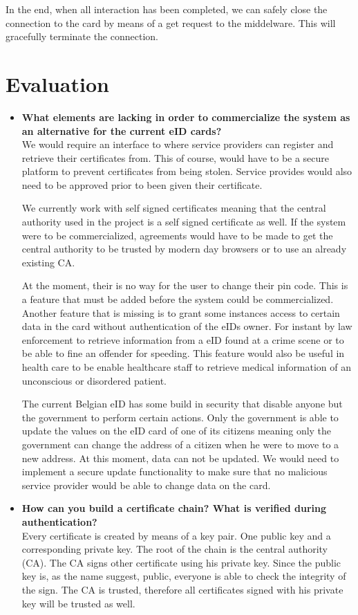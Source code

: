\documentclass[12pt]{report}
\begin{document}
In the end, when all interaction has been completed, we can safely close the connection to the card by means of a get request to the middelware. This will gracefully terminate the connection.

\section{Evaluation}
\begin{itemize}
\item \textbf{What elements are lacking in order to commercialize the system as an alternative for the current eID cards?}\\ 
We would require an interface to where service providers can register and retrieve their certificates from. This of course, would have to be a secure platform to prevent certificates from being stolen. Service provides would also need to be approved prior to been given their certificate.

We currently work with self signed certificates meaning that the central authority used in the project is a self signed certificate as well. If the system were to be commercialized, agreements would have to be made to get the central authority to be trusted by modern day browsers or to use an already existing CA.

At the moment, their is no way for the user to change their pin code. This is a feature that must be added before the system could be commercialized. Another feature that is missing is to grant some instances access to certain data in the card without authentication of the eIDs owner. For instant by law enforcement to retrieve information from a eID found at a crime scene or to be able to fine an offender for speeding. This feature would also be useful in health care to be enable healthcare staff to retrieve medical information of an unconscious or disordered patient.

The current Belgian eID has some build in security that disable anyone but the government to perform certain actions. Only the government is able to update the values on the eID card of one of its citizens meaning only the government can change the address of a citizen when he were to move to a new address. At this moment, data can not be updated. We would need to implement a secure update functionality to make sure that no malicious service provider would be able to change data on the card.

\item \textbf{How can you build a certificate chain? What is verified during authentication?}\\
Every certificate is created by means of a key pair. One public key and a corresponding private key. The root of the chain is the central authority (CA). The CA signs other certificate using his private key. Since the public key is, as the name suggest, public, everyone is able to check the integrity of the sign. The CA is trusted, therefore all certificates signed with his private key will be trusted as well.


\end{itemize}
\end{document}
